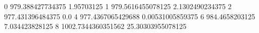 0 979.388427734375 1.95703125
1 979.5616455078125 2.1302490234375
2 977.431396484375 0.0
4 977.4367065429688 0.00531005859375
6 984.4658203125 7.034423828125
8 1002.7344360351562 25.30303955078125
